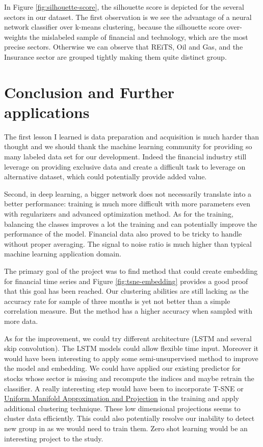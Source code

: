 \documentclass[a4paper,twoside]{article}
\begin{document}
In Figure \ref{fig:silhouette-score}, the silhouette score is depicted for the
several sectors in our dataset. The first observation is we see the advantage
of a neural network classifier over k-means clustering, because the silhouette
score over-weights the mislabeled sample of financial and technology, which are
the most precise sectors. Otherwise we can observe that REiTS, Oil and Gas,
and the Insurance sector are grouped tightly making them quite distinct group.


\section{Conclusion and Further applications}
\label{sec:org888f928}

The first lesson I learned is data preparation and acquisition is much harder
than thought and we should thank the machine learning community for providing
so many labeled data set for our development. Indeed the financial industry
still leverage on providing exclusive data and create a difficult task to
leverage on alternative dataset, which could potentially provide added value.

Second, in deep learning, a bigger network does not necessarily translate into
a better performance: training is much more difficult with more parameters
even with regularizers and advanced optimization method. As for the training,
balancing the classes improves a lot the training and can potentially improve
the performance of the model. Financial data also proved to be tricky to
handle without proper averaging. The signal to noise ratio is much higher than
typical machine learning application domain.

The primary goal of the project was to find method that could create embedding
for financial time series and Figure \ref{fig:tsne-embedding} provides a good
proof that this goal has been reached. Our clustering abilities are still
lacking as the accuracy rate for sample of three months is yet not better than
a simple correlation measure. But the method has a higher accuracy when
sampled with more data. 

As for the improvement, we could try different architecture (LSTM and several
skip convolution). The LSTM models could allow flexible time input. Moreover
it would have been interesting to apply some semi-unsupervised method to
improve the model and embedding. We could have applied our existing predictor
for stocks whose sector is missing and recompute the indices and maybe retrain
the classifier. A really interesting step would have been to incorporate T-SNE
or \href{https://github.com/lmcinnes/umap}{Uniform Manifold Approximation and Projection} in the training and apply
additional clustering technique. These low dimensional projections seems to
cluster data efficiently. This could also potentially resolve our inability to
detect new group in as we would need to train them. Zero shot learning would
be an interesting project to the study.
\end{document}
